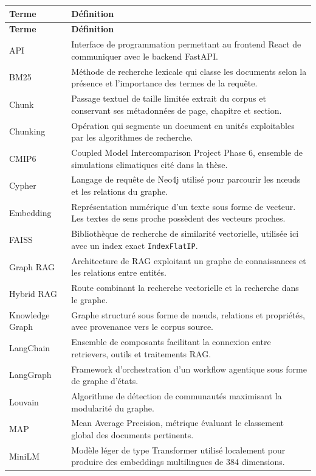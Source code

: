 \documentclass[12pt,a4paper,oneside]{report}
\newcommand{\tech}[1]{\texttt{#1}}
\begin{document}
\begin{longtable}{p{}p{}}
\toprule
\textbf{Terme} & \textbf{Définition}\\
\midrule
\endfirsthead
\toprule
\textbf{Terme} & \textbf{Définition}\\
\midrule
\endhead
API & Interface de programmation permettant au frontend React de communiquer avec le backend FastAPI.\\
BM25 & Méthode de recherche lexicale qui classe les documents selon la présence et l'importance des termes de la requête.\\
Chunk & Passage textuel de taille limitée extrait du corpus et conservant ses métadonnées de page, chapitre et section.\\
Chunking & Opération qui segmente un document en unités exploitables par les algorithmes de recherche.\\
CMIP6 & Coupled Model Intercomparison Project Phase 6, ensemble de simulations climatiques cité dans la thèse.\\
Cypher & Langage de requête de Neo4j utilisé pour parcourir les nœuds et les relations du graphe.\\
Embedding & Représentation numérique d'un texte sous forme de vecteur. Les textes de sens proche possèdent des vecteurs proches.\\
FAISS & Bibliothèque de recherche de similarité vectorielle, utilisée ici avec un index exact \tech{IndexFlatIP}.\\
Graph RAG & Architecture de RAG exploitant un graphe de connaissances et les relations entre entités.\\
Hybrid RAG & Route combinant la recherche vectorielle et la recherche dans le graphe.\\
Knowledge Graph & Graphe structuré sous forme de nœuds, relations et propriétés, avec provenance vers le corpus source.\\
LangChain & Ensemble de composants facilitant la connexion entre retrievers, outils et traitements RAG.\\
LangGraph & Framework d'orchestration d'un workflow agentique sous forme de graphe d'états.\\
Louvain & Algorithme de détection de communautés maximisant la modularité du graphe.\\
MAP & Mean Average Precision, métrique évaluant le classement global des documents pertinents.\\
MiniLM & Modèle léger de type Transformer utilisé localement pour produire des embeddings multilingues de 384 dimensions.\\

\end{longtable}
\end{document}
